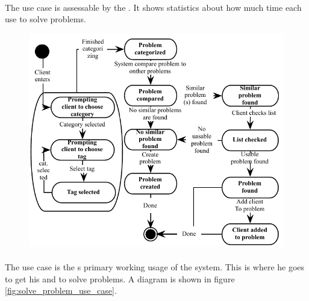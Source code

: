 
\paragraph{\gstat[c]} The use case \gstat[] is assessable by the \admin[]. It shows statistics about how much time each \astaff[] use to solve problems.


\begin{figure}[htbp]
\begin{center}
 \includegraphics[scale=0.8]{input/application_domain_analysis/submit_problem_use_case}
\label{fig:submit_problem_use_case}
\end{center}
\end{figure}

\paragraph{\ucsolproblem[c]} The use case \ucsolproblem{} is the \astaff{}s primary working usage of the system. This is where he goes to get his \todolist{} and to solve problems. A diagram is shown in figure \ref{fig:solve_problem_use_case}.

